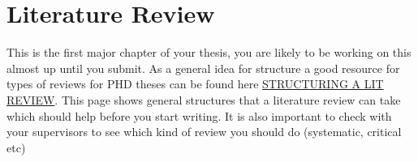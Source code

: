 \documentclass[../main.tex]{subfiles}
\begin{document}
\section{Literature Review}

This is the first major chapter of your thesis, you are likely to be working on this almost up until you submit. As a general idea for structure a good resource for types of reviews for PHD theses can be found here \href{https://www.ncl.ac.uk/academic-skills-kit/assessment/dissertations-and-theses/structuring-a-literature-review/}{STRUCTURING A LIT REVIEW}. This page shows general structures that a literature review can take which should help before you start writing. It is also important to check with your supervisors to see which kind of review you should do (systematic, critical etc)
\end{document}
